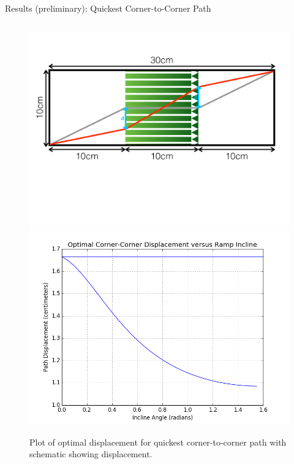 \begin{frame}{Results (preliminary): Quickest Corner-to-Corner Path}
\begin{figure}
\begin{columns}[T,onlytextwidth]
\includegraphics[width=\textwidth]{images/optimal_cor_cor_schematic}
\includegraphics[width=\textwidth]{images/optimal_corner_corner}
\end{columns}
\caption{Plot of optimal displacement for quickest corner-to-corner path with schematic showing displacement.}
\end{figure}
\end{frame}

